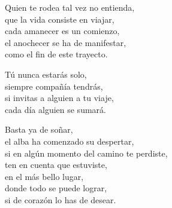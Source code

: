 \begin{center}
\vspace{1em} 
Quien te rodea tal vez no entienda,\\ 
que la vida consiste en viajar,\\ 
cada amanecer es un comienzo,\\ 
el anochecer se ha de manifestar,\\ 
como el fin de este trayecto.

\vspace{1em} 
Tú nunca estarás solo,\\ 
siempre compañía tendrás,\\ 
si invitas a alguien a tu viaje,\\ 
cada día alguien se sumará.

\vspace{1em} 
Basta ya de soñar,\\ 
el alba ha comenzado su despertar,\\ 
si en algún momento del camino te perdiste,\\ 
ten en cuenta que estuviste,\\ 
en el más bello lugar,\\ 
donde todo se puede lograr,\\ 
si de corazón lo has de desear.


\end{center}




